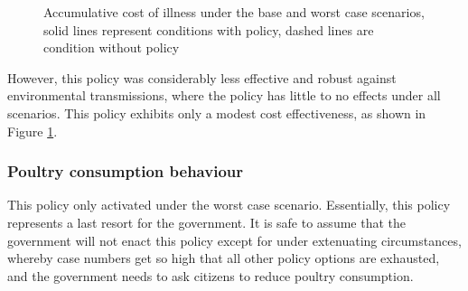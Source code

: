 \begin{figure}[h!]
\begin{minipage}{0.45\textwidth}
        \caption{Accumulative cost of illness under the base and worst case scenarios, solid lines represent conditions with policy, dashed lines are condition without policy}
        \label{fig:fs_bwc_acoi}
    \end{minipage}
\end{figure}

However, this policy was considerably less effective and robust against environmental transmissions, where the policy has little to no effects under all scenarios. This policy exhibits only a modest cost effectiveness, as shown in Figure \ref{fig:fs_bwc_acoi}. %


\subsubsection{Poultry consumption behaviour}
\label{sec: consumption behaviour}

This policy only activated under the worst case scenario. Essentially, this policy represents a last resort for the government. It is safe to assume that the government will not enact this policy except for under extenuating circumstances, whereby case numbers get so high that all other policy options are exhausted, and the government needs to ask citizens to reduce poultry consumption.

